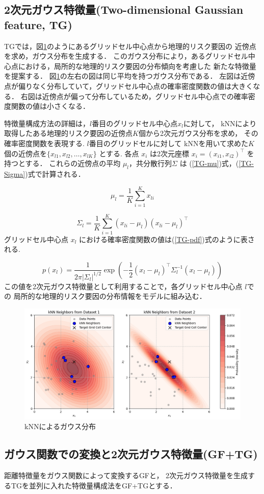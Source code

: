 \subsection{2次元ガウス特徴量(Two-dimensional Gaussian feature, TG)}
TGでは，図\ref{fig:TG-knn}のようにあるグリッドセル中心点から地理的リスク要因の
近傍点を求め，ガウス分布を生成する．
このガウス分布により，あるグリッドセル中心点における，局所的な地理的リスク要因の分布傾向を考慮した
新たな特徴量を提案する．
図\ref{fig:TG-knn}の左右の図は同じ平均を持つガウス分布である．
左図は近傍点が偏りなく分布していて，グリッドセル中心点の確率密度関数の値は大きくなる．
右図は近傍点が偏って分布しているため，グリッドセル中心点での確率密度関数の値は小さくなる．

特徴量構成方法の詳細は，$l$番目のグリッドセル中心点$x_l$に対して，
kNN\citep{bishop2007}により取得したある地理的リスク要因の近傍点$K$個から2次元ガウス分布を求め，
その確率密度関数を表現する.
$l$番目のグリッドセルに対して 
kNNを用いて求めた\( K \) 個の近傍点を\( \{ x_{l1}, x_{l2}, \dots, x_{lK} \} \) とする.
各点 \( x_i \) は2次元座標 \( x_i = (x_{i1}, x_{i2})^\top \) を持つとする．
これらの近傍点の平均 \( \mu_l \)，共分散行列\( \Sigma\) は
(\ref{TG-mu})式，(\ref{TG-Sigma})式で計算される．

\begin{equation}\label{TG-mu}
  \mu_l = \frac{1}{K} \sum_{i=1}^{K} x_{li}
\end{equation}

\begin{equation}\label{TG-Sigma}
  \Sigma_l = \frac{1}{K} \sum_{i=1}^{K} (x_{li} - \mu_l)(x_{li} - \mu_l)^\top
\end{equation}
グリッドセル中心点 \( x_l \) における確率密度関数の値は(\ref{TG-pdf})式のように表される.

\begin{equation}\label{TG-pdf}
p(x_l) = \frac{1}{2\pi |\Sigma_l|^{1/2}} \exp \left( -\frac{1}{2} (x_l - \mu_l)^\top \Sigma_l^{-1} (x_l - \mu_l) \right)
\end{equation}
この値を2次元ガウス特徴量として利用することで，各グリッドセル中心点 \( l \)での
局所的な地理的リスク要因の分布情報をモデルに組み込む．

\begin{figure}[H]
  \centering %
  \includegraphics[scale=0.3]{./util-fig/TG-knn.png}
  \caption{kNNによるガウス分布}
  \label{fig:TG-knn}
\end{figure}
\subsection{ガウス関数での変換と2次元ガウス特徴量(GF+TG)}
距離特徴量をガウス関数によって変換するGFと，
2次元ガウス特徴量を生成するTGを並列に入れた特徴量構成法をGF+TGとする．